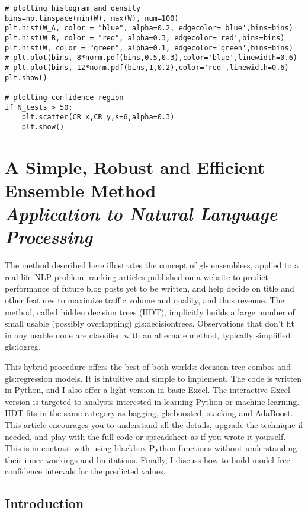 \documentclass[oneside,10pt]{book}
\newcommand\Chapter[2]{
  \chapter[#1]{#1\\[2ex]\Large\itshape#2}
}
\begin{document}
\begin{lstlisting}[escapechar=@]
# plotting histogram and density
bins=np.linspace(min(W), max(W), num=100)
plt.hist(W_A, color = "blue", alpha=0.2, edgecolor='blue',bins=bins) 
plt.hist(W_B, color = "red", alpha=0.3, edgecolor='red',bins=bins) 
plt.hist(W, color = "green", alpha=0.1, edgecolor='green',bins=bins) 
# plt.plot(bins, 8*norm.pdf(bins,0.5,0.3),color='blue',linewidth=0.6) 
# plt.plot(bins, 12*norm.pdf(bins,1,0.2),color='red',linewidth=0.6) 
plt.show()

# plotting confidence region
if N_tests > 50:
    plt.scatter(CR_x,CR_y,s=6,alpha=0.3) 
    plt.show() 
\end{lstlisting}

\Chapter{A Simple, Robust and Efficient Ensemble Method}{Application to Natural Language Processing}

The method described here illustrates the concept of \glspl{gls:ensembles}, applied to a real life NLP problem: ranking articles published on a website to 
predict performance of future blog posts yet to be written, and help decide on title and other features to maximize traffic volume and quality, and thus revenue.  
The method, called hidden decision trees (HDT), implicitly builds a large number of small usable (possibly overlapping) \glspl{gls:decisiontree}. Observations that 
don't fit in any usable node are classified with an alternate method, typically simplified \gls{gls:logreg}. 

This hybrid procedure offers the best of both worlds: decision tree combos  and \gls{gls:regression} models.  It is intuitive and simple to implement. The code is written in Python, and I also offer a light version in basic Excel. The interactive Excel version is targeted to analysts interested in learning Python or machine learning. HDT fits in the same category as bagging, \gls{gls:boosted}, stacking and \textcolor{index}{AdaBoost}.  This article encourages you to understand all the details, upgrade the technique if needed, and play with the full code or spreadsheet as if you wrote it yourself. This is in contrast with using blackbox Python functions without understanding their inner workings and limitations. Finally, I discuss how to build model-free confidence intervals for the predicted values.

 \section{Introduction}
\end{document}
